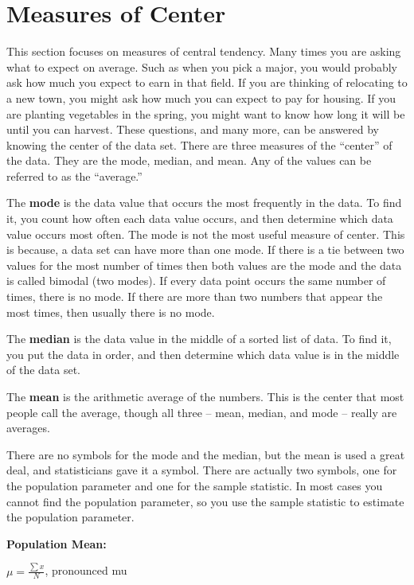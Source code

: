 \documentclass[
]{book}
\begin{document}
\hypertarget{measures-of-center}{%
\section{Measures of Center}\label{measures-of-center}}

This section focuses on measures of central tendency. Many times you are asking what to expect on average. Such as when you pick a major, you would probably ask how much you expect to earn in that field. If you are thinking of relocating to a new town, you might ask how much you can expect to pay for housing. If you are planting vegetables in the spring, you might want to know how long it will be until you can harvest. These questions, and many more, can be answered by knowing the center of the data set. There are three measures of the ``center'' of the data. They are the mode, median, and mean. Any of the values can be referred to as the ``average.''

The \textbf{mode} is the data value that occurs the most frequently in the data. To find it, you count how often each data value occurs, and then determine which data value occurs most often. The mode is not the most useful measure of center. This is because, a data set can have more than one mode. If there is a tie between two values for the most number of times then both values are the mode and the data is called bimodal (two modes). If every data point occurs the same number of times, there is no mode. If there are more than two numbers that appear the most times, then usually there is no mode.

The \textbf{median} is the data value in the middle of a sorted list of data. To find it, you put the data in order, and then determine which data value is in the middle of the data set.

The \textbf{mean} is the arithmetic average of the numbers. This is the center that most people call the average, though all three -- mean, median, and mode -- really are averages.

There are no symbols for the mode and the median, but the mean is used a great deal, and statisticians gave it a symbol. There are actually two symbols, one for the population parameter and one for the sample statistic. In most cases you cannot find the population parameter, so you use the sample statistic to estimate the population parameter.

\textbf{Population Mean:}

\(\mu=\frac{\sum{x}}{N}\), pronounced mu
\end{document}
